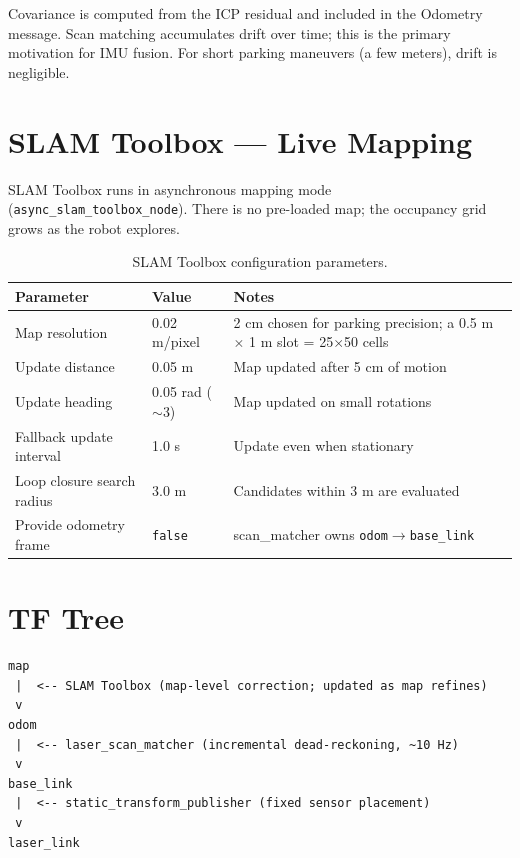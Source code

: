 \documentclass[12pt,a4paper]{report}
\begin{document}
Covariance is computed from the ICP residual and included in the Odometry message. Scan matching accumulates drift over time; this is the primary motivation for IMU fusion. For short parking maneuvers (a few meters), drift is negligible.

\section{SLAM Toolbox --- Live Mapping}

SLAM Toolbox runs in asynchronous mapping mode (\texttt{async\_slam\_toolbox\_node}). There is no pre-loaded map; the occupancy grid grows as the robot explores.

\begin{table}[H]
\centering
\caption{SLAM Toolbox configuration parameters.}
\label{tab:slam}
\begin{tabularx}{\textwidth}{|p{4cm}|p{2.2cm}|X|}
\hline
\textbf{Parameter} & \textbf{Value} & \textbf{Notes} \\
\hline
Map resolution & 0.02 m/pixel & 2 cm chosen for parking precision; a 0.5 m $\times$ 1 m slot = 25$\times$50 cells \\
\hline
Update distance & 0.05 m & Map updated after 5 cm of motion \\
\hline
Update heading & 0.05 rad ($\sim$3\textdegree{}) & Map updated on small rotations \\
\hline
Fallback update interval & 1.0 s & Update even when stationary \\
\hline
Loop closure search radius & 3.0 m & Candidates within 3 m are evaluated \\
\hline
Provide odometry frame & \texttt{false} & scan\_matcher owns \texttt{odom$\rightarrow$base\_link} \\
\hline
\end{tabularx}
\end{table}

\section{TF Tree}

\begin{lstlisting}
map
 |  <-- SLAM Toolbox (map-level correction; updated as map refines)
 v
odom
 |  <-- laser_scan_matcher (incremental dead-reckoning, ~10 Hz)
 v
base_link
 |  <-- static_transform_publisher (fixed sensor placement)
 v
laser_link
\end{lstlisting}
\end{document}
